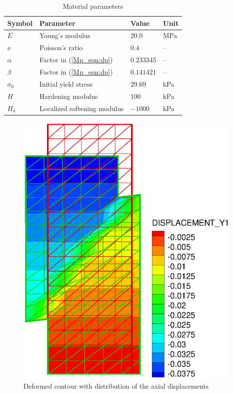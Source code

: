 \begin{table}[!htb]
\centering
\caption{Material parameters}
\label{Mp_ex1:tableDP}
\begin{tabular}{llll}
\toprule
Symbol & Parameter & Value & Unit \\
\midrule
$E$          & Young's modulus             & $20.0$     & MPa \\
$\nu$        & Poisson's ratio             & $0.4$      & --  \\
$\alpha$     & Factor in (\ref{Mp_eqn:dp}) & $0.233345$ & --  \\
$\beta$      & Factor in (\ref{Mp_eqn:dp}) & $0.141421$ & --  \\
$\sigma_0$   & Initial yield stress        & $29.69$    & kPa \\
$H$          & Hardening modulus           & $100$      & kPa \\
$H_{\delta}$ & Localized softening modulus & $-1000$    & kPa \\
\bottomrule
\end{tabular}
\end{table}
%
\begin{figure}[htb]
\begin{center}
\includegraphics[scale=0.3]{PART_II/M/m_sdc.eps}
\end{center}
\vspace*{-6.0ex}
\caption{Deformed contour with distribution of the axial displacements}
 \label{Mp_fig:loc}
\end{figure}

